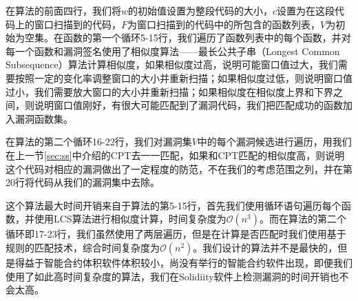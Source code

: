 在算法的前面四行，我们将$w$的初始值设置为整段代码的大小，$c$设置为在这段代码上的窗口扫描到的代码，$F$为窗口扫描到的代码中的所包含的函数列表，$V$为初始为空集。在函数的第一个循环5-15行，我们遍历了函数列表中的每个函数，并对每一个函数和漏洞签名使用了相似度算法——最长公共子串（Longest Common Subsequence）算法计算相似度，如果相似度过高，说明可能窗口值过大，我们需要按照一定的变化率调整窗口的大小并重新扫描；如果相似度过低，则说明窗口值过小，我们需要放大窗口的大小并重新扫描；如果相似度在相似度上界和下界之间，则说明窗口值刚好，有很大可能匹配到了漏洞代码，我们把匹配成功的函数加入漏洞函数集。

在算法的第二个循环16-22行，我们对漏洞集$V$中的每个漏洞候选进行遍历，用我们在上一节\ref{sec:ss}中介绍的CPT去一一匹配，如果和CPT匹配的相似度高，则说明这个代码对相应的漏洞做出了一定程度的防范，不在我们的考虑范围之列，并在第20行将代码从我们的漏洞集中去除。

这个算法最大时间开销来自于算法的第5-15行，首先我们使用循环语句遍历每个函数，并使用LCS算法进行相似度计算，时间复杂度为$\mathcal{O}(n^{3})$。而在算法的第二个循环即17-23行，我们虽然使用了两层遍历，但是在计算是否匹配时我们使用基于规则的匹配技术，综合时间复杂度为$\mathcal{O}(n^{2})$。我们设计的算法并不是最快的，但是得益于智能合约体积软件体积较小，尚没有举行的智能合约软件出现，即便我们使用了如此高时间复杂度的算法，我们在Solidiity软件上检测漏洞的时间开销也不会太高。
